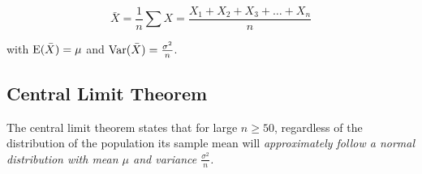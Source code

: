 \documentclass[../main]{subfiles}
\begin{document}
	\[	\bar{X} = \frac{1}{n} \sum X = \frac{X_1 + X_2 + X_3 + \dots + X_n}{n}
	\]

	with \(\operatorname{E}(\bar{X}) = \mu\) and \(\operatorname{Var}(\bar{X}) = \frac{\sigma^2}{n}\).

	\subsection{Central Limit Theorem}

	The central limit theorem states that for large \(n \geq 50\), regardless of the distribution of the population its sample mean will \em{approximately} follow a normal distribution with mean \(\mu\) and variance \(\frac{\sigma^2}{n}\). 
\end{document}
